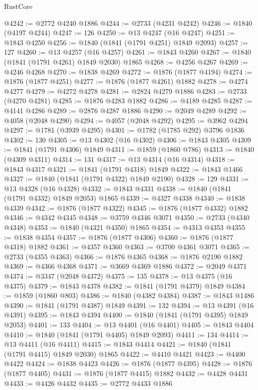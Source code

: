 \begin{lexlean}{RustCore}
\begin{coremodule}
@4242 := @2772 @4240 @1886
@4244 := @2733 (@4231 @4242)
@4246 := @1840 (@4197 @4244)
@4247 := 126
@4250 := @13 @4247 (@16 @4247)
@4251 := @1843 @4250
@4256 := @1840 (@1841 (@1791 @4251) @1849 @2093)
@4257 := 127
@4260 := @13 @4257 (@16 @4257)
@4261 := @1843 @4260
@4267 := @1840 (@1841 (@1791 @4261) @1849 @2030) @1865
@4268 := @4256 @4267
@4269 := @4246 @4268
@4270 := @1838 @4269
@4272 := @1876 (@1877 @4194)
@4274 := @1876 (@1877 @4251)
@4277 := @1876 (@1877 @4261) @1882
@4278 := @4274 @4277
@4279 := @4272 @4278
@4281 := @2824 @4279 @1886
@4283 := @2733 (@4270 @4281)
@4285 := @1876 @4283 @1882
@4286 := @4189 @4285
@4287 := @4141 @4286
@4289 := @2876 @4287 @1886
@4290 := @2049 @4289
@4292 := @4058 (@2048 @4290)
@4294 := @4057 (@2048 @4292)
@4295 := @3962 @4294
@4297 := @1781 (@3939 @4295)
@4301 := @1782 (@1785 @292) @3796 @1836
@4302 := 130
@4305 := @13 @4302 (@16 @4302)
@4306 := @1843 @4305
@4309 := @1841 (@1791 @4306) @1849
@4311 := @1859 (@1860 @786)
@4313 := @1840 (@4309 @4311)
@4314 := 131
@4317 := @13 @4314 (@16 @4314)
@4318 := @1843 @4317
@4321 := @1841 (@1791 @4318) @1849
@4322 := @1843 @1466
@4327 := @1840 (@1841 (@1791 @4322) @1849 @2190)
@4328 := 129
@4331 := @13 @4328 (@16 @4328)
@4332 := @1843 @4331
@4338 := @1840 (@1841 (@1791 @4332) @1849 @2053) @1865
@4339 := @4327 @4338
@4340 := @1838 @4339
@4342 := @1876 (@1877 @4322)
@4345 := @1876 (@1877 @4332) @1882
@4346 := @4342 @4345
@4348 := @3759 @4346 @3071
@4350 := @2733 (@4340 @4348)
@4353 := @1840 (@4321 @4350) @1865
@4354 := @4313 @4353
@4355 := @1838 @4354
@4357 := @1876 (@1877 @4306)
@4360 := @1876 (@1877 @4318) @1882
@4361 := @4357 @4360
@4363 := @3700 @4361 @3071
@4365 := @2733 (@4355 @4363)
@4366 := @1876 @4365
@4368 := @1876 @2190 @1882
@4369 := @4366 @4368
@4371 := @3669 @4369 @1886
@4372 := @2049 @4371
@4374 := @3347 (@2048 @4372)
@4375 := 135
@4378 := @13 @4375 (@16 @4375)
@4379 := @1843 @4378
@4382 := @1841 (@1791 @4379) @1849
@4384 := @1859 (@1860 @803)
@4386 := @1840 (@4382 @4384)
@4387 := @1843 @1486
@4390 := @1841 (@1791 @4387) @1849
@4391 := 132
@4394 := @13 @4391 (@16 @4391)
@4395 := @1843 @4394
@4400 := @1840 (@1841 (@1791 @4395) @1849 @2053)
@4401 := 133
@4404 := @13 @4401 (@16 @4401)
@4405 := @1843 @4404
@4410 := @1840 (@1841 (@1791 @4405) @1849 @2093)
@4411 := 134
@4414 := @13 @4411 (@16 @4411)
@4415 := @1843 @4414
@4421 := @1840 (@1841 (@1791 @4415) @1849 @2030) @1865
@4422 := @4410 @4421
@4423 := @4400 @4422
@4424 := @1838 @4423
@4426 := @1876 (@1877 @4395)
@4428 := @1876 (@1877 @4405)
@4431 := @1876 (@1877 @4415) @1882
@4432 := @4428 @4431
@4433 := @4426 @4432
@4435 := @2772 @4433 @1886

\end{coremodule}
\end{lexlean}
